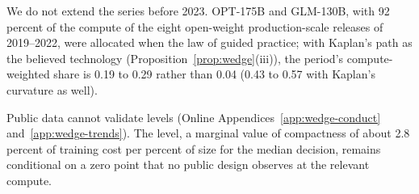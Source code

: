 We do not extend the series before 2023. OPT-175B and GLM-130B, with 92 percent of the compute of the eight open-weight
production-scale releases of 2019--2022, were allocated when the law of \citet{kaplan2020scaling} guided practice; with
Kaplan's path as the believed technology (Proposition~\ref{prop:wedge}(iii)), the period's compute-weighted share is 0.19
to 0.29 rather than 0.04 (0.43 to 0.57 with Kaplan's curvature as well).

Public data cannot validate levels (Online Appendices~\ref{app:wedge-conduct} and~\ref{app:wedge-trends}). The level, a
marginal value of compactness of about 2.8 percent of training cost per percent of size for the median decision, remains
conditional on a zero point that no public design observes at the relevant compute.
